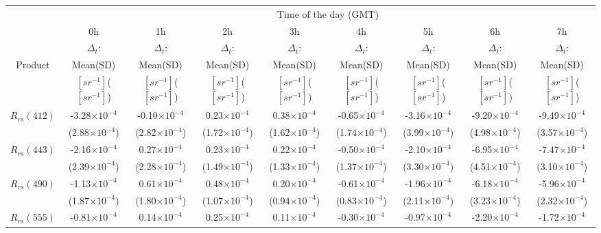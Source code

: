 \documentclass[preview]{standalone}
\begin{document}
\scriptsize
\centering
\setlength\tabcolsep{1.5pt} %
\begin{tabular}{ccccccccc} \hline
   &   \multicolumn{8}{c}{Time of the day (GMT)}    \\ \cline{2-9}
&    0h    & 1h  &  2h  &  3h  &  4h  &  5h  &  6h   &  7h   \\ 
   &    $\Delta_t$:    & $\Delta_t$:  &  $\Delta_t$:  &  $\Delta_t$:  &  $\Delta_t$:  &  $\Delta_t$:  &  $\Delta_t$:   &  $\Delta_t$:  \\ 
Product   &     Mean(SD)    & Mean(SD)  &  Mean(SD)  &  Mean(SD)  &  Mean(SD)  &  Mean(SD)  &  Mean(SD)   &  Mean(SD)  \\ 
  &  $[sr^{-1}]$($[sr^{-1}]$)    & $[sr^{-1}]$($[sr^{-1}]$)  &  $[sr^{-1}]$($[sr^{-1}]$)  &  $[sr^{-1}]$($[sr^{-1}]$)  &  $[sr^{-1}]$($[sr^{-1}]$)  &  $[sr^{-1}]$($[sr^{-1}]$)  &  $[sr^{-1}]$($[sr^{-1}]$)   &  $[sr^{-1}]$($[sr^{-1}]$)   \\ \hline \hline
$R_{rs}(412)$ 	& -3.28$\times10^{-4}$ &   -0.10$\times10^{-4}$ &    0.23$\times10^{-4}$ &    0.38$\times10^{-4}$ &   -0.65$\times10^{-4}$ &   -3.16$\times10^{-4}$ &   -9.20$\times10^{-4}$ &   -9.49$\times10^{-4}$ \\
	& (2.88$\times10^{-4}$) & (2.82$\times10^{-4}$) & (1.72$\times10^{-4}$) & (1.62$\times10^{-4}$) & (1.74$\times10^{-4}$) & (3.99$\times10^{-4}$) & (4.98$\times10^{-4}$) & (3.57$\times10^{-4}$) \\ \hline
$R_{rs}(443)$ 	& -2.16$\times10^{-4}$ &    0.27$\times10^{-4}$ &    0.23$\times10^{-4}$ &    0.22$\times10^{-4}$ &   -0.50$\times10^{-4}$ &   -2.10$\times10^{-4}$ &   -6.95$\times10^{-4}$ &   -7.47$\times10^{-4}$ \\
	& (2.39$\times10^{-4}$) & (2.28$\times10^{-4}$) & (1.49$\times10^{-4}$) & (1.33$\times10^{-4}$) & (1.37$\times10^{-4}$) & (3.30$\times10^{-4}$) & (4.51$\times10^{-4}$) & (3.10$\times10^{-4}$) \\ \hline
$R_{rs}(490)$ 	& -1.13$\times10^{-4}$ &    0.61$\times10^{-4}$ &    0.48$\times10^{-4}$ &    0.20$\times10^{-4}$ &   -0.61$\times10^{-4}$ &   -1.96$\times10^{-4}$ &   -6.18$\times10^{-4}$ &   -5.96$\times10^{-4}$ \\
	& (1.87$\times10^{-4}$) & (1.80$\times10^{-4}$) & (1.07$\times10^{-4}$) & (0.94$\times10^{-4}$) & (0.83$\times10^{-4}$) & (2.11$\times10^{-4}$) & (3.23$\times10^{-4}$) & (2.32$\times10^{-4}$) \\ \hline
$R_{rs}(555)$ 	& -0.81$\times10^{-4}$  &   0.14$\times10^{-4}$  &   0.25$\times10^{-4}$  &   0.11$\times10^{-4}$  &  -0.30$\times10^{-4}$  &  -0.97$\times10^{-4}$  &  -2.20$\times10^{-4}$  &  -1.72$\times10^{-4}$ \\

\end{tabular}
\end{document}

